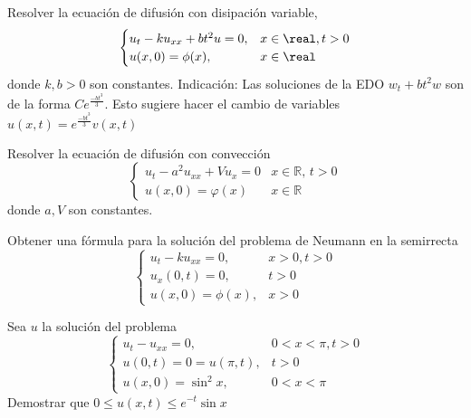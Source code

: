 \begin{problem}[17] Resolver la ecuación de difusión con disipación variable,
\[ \begin{cases}
u_t-ku_{xx}+bt^2u=0,     & x\in \real, t>0 \\
u(x,0)=\phi(x),          & x\in \real
\end{cases} \]
donde $ k,b>0 $ son constantes. Indicación: Las soluciones de la EDO $ w_t+bt^2w $ son de la forma $ Ce^{\frac{-bt^3}{3}} $. Esto sugiere hacer el cambio de variables $ u(x,t)=e^{\frac{-bt^3}{3}}v(x,t) $

\solution

\end{problem}





\begin{problem}[18] Resolver la ecuación de difusión con convección \[ \begin{cases}
u_t - a^2 u_{xx} + Vu_x = 0 & x ∈ ℝ,\, t > 0 \\
u(x,0) = φ(x) & x ∈ ℝ
\end{cases} \] donde $a,V$ son constantes. 
\solution

\end{problem}





\begin{problem}[19] Obtener una fórmula para la solución del problema de Neumann en la semirrecta 
\[ \begin{cases}
u_t-ku_{xx}=0,      & x>0, t>0 \\
u_x(0,t)=0,         & t>0 \\
u(x,0)=\phi(x),     & x>0
\end{cases} \]

\solution

\end{problem}





\begin{problem}[20] Sea $ u $ la solución del problema
\[ \begin{cases}
u_t-u_{xx}=0,      & 0<x<\pi, t>0 \\
u(0,t)=0=u(\pi,t),  & t>0 \\
u(x,0)=\sin^2x,     & 0<x<\pi
\end{cases} \] Demostrar que $ 0 \leq u(x,t) \leq e^{-t}\sin x $

\solution

\end{problem}





